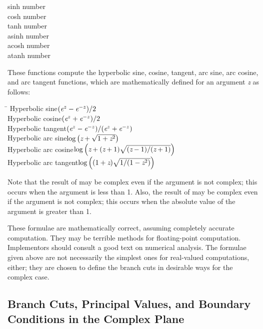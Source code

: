 \begin{defun}[Function]
sinh number \\
cosh number \\
tanh number \\
asinh number \\
acosh number \\
atanh number

These functions compute the hyperbolic sine, cosine, tangent,
arc sine, arc cosine, and arc tangent functions, which are mathematically
defined for an argument \emph{z} as follows:

\begin{tabbing}
\hskip 10pc\=\kill
Hyperbolic sine\>$ (\emph{e}^{z}-\emph{e}^{-z})/2 $ \\
Hyperbolic cosine\>$ (\emph{e}^{z}+\emph{e}^{-z})/2 $ \\
Hyperbolic tangent\>$ (\emph{e}^{z}-\emph{e}^{-z})/(\emph{e}^{z}+\emph{e}^{-z}) $ \\[2pt]
Hyperbolic arc sine\>$ \log \left(\emph{z}+\sqrt{1+\emph{z}^2}\right) $ \\[2pt]
Hyperbolic arc cosine\>$ \log
\left(\emph{z}+(\emph{z}+1)\sqrt{(\emph{z}-1)/(\emph{z}+1)}\right) $ \\[2pt]
Hyperbolic arc tangent\>$ \log \left((1+\emph{z})\sqrt{1/(1-\emph{z}^2)}\right) $
\end{tabbing}

Note that the result of  may be
complex even if the argument is not complex; this occurs
when the argument is less than 1.
Also, the result of  may be
complex even if the argument is not complex; this occurs
when the absolute value of the argument is greater than 1.

\beforenoterule
\begin{implementation}
These formulae are mathematically correct, assuming
completely accurate computation.  They may be terrible methods for
floating-point computation.  Implementors should consult a good text on
numerical analysis.  The formulae given above are not necessarily
the simplest ones for real-valued computations, either; they are chosen
to define the branch cuts in desirable ways for the complex case.
\end{implementation}
\afternoterule
\end{defun}

\subsection{Branch Cuts, Principal Values, and Boundary Conditions in the
  Complex Plane}
\label{BRANCH-CUTS-SECTION}

